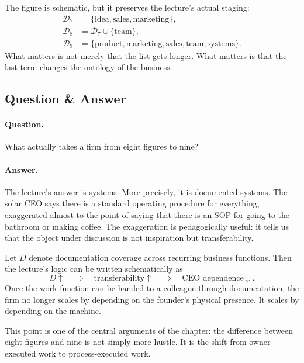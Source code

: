 The figure is schematic, but it preserves the lecture's actual staging:
\begin{align}
\mathcal{D}_7 &= \{\text{idea},\text{sales},\text{marketing}\},\\
\mathcal{D}_8 &= \mathcal{D}_7\cup\{\text{team}\},\\
\mathcal{D}_9 &= \{\text{product},\text{marketing},\text{sales},\text{team},\text{systems}\}.
\end{align}
What matters is not merely that the list gets longer. What matters is that the last term changes the ontology of the business.

\subsection{Question \& Answer}

\paragraph{Question.}
What actually takes a firm from eight figures to nine?

\paragraph{Answer.}
The lecture's answer is systems. More precisely, it is documented systems. The solar CEO says there is a standard operating procedure for everything, exaggerated almost to the point of saying that there is an SOP for going to the bathroom or making coffee. The exaggeration is pedagogically useful: it tells us that the object under discussion is not inspiration but transferability.

Let \(D\) denote documentation coverage across recurring business functions. Then the lecture's logic can be written schematically as
\begin{equation}
D \uparrow
\quad \Longrightarrow \quad
\text{transferability} \uparrow
\quad \Longrightarrow \quad
\text{CEO dependence} \downarrow.
\end{equation}
Once the work function can be handed to a colleague through documentation, the firm no longer scales by depending on the founder's physical presence. It scales by depending on the machine.

This point is one of the central arguments of the chapter: the difference between eight figures and nine is not simply more hustle. It is the shift from owner-executed work to process-executed work.

